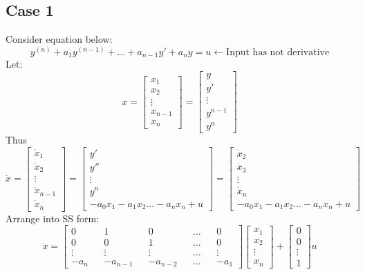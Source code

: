 \subsection{Case 1}
Consider equation below:
\[
y^{(n)} + a_1y^{(n-1)} + ... + a_{n-1}y' + a_n y = u  \leftarrow \text{Input has not derivative}
\]
Let:
\[
x = 
\begin{bmatrix}
	x_1     \\
	x_2     \\
	\vdots  \\
	x_{n-1} \\
	x_n     
\end{bmatrix}
=
\begin{bmatrix}
	y       \\
	y'      \\
	\vdots  \\
	y^{n-1} \\
	y^n     
\end{bmatrix}
\]
Thus
\[
\dot{x} = 
\begin{bmatrix}
	\dot{x}_1     \\
	\dot{x}_2     \\
	\vdots        \\
	\dot{x}_{n-1} \\
	\dot{x}_n     
\end{bmatrix}
=
\begin{bmatrix}
	y'                                \\
	y''                               \\
	\vdots                            \\
	y^n                               \\
	-a_0x_1 - a_1x_2 ... - a_nx_n + u 
\end{bmatrix}
=
\begin{bmatrix}
	\dot{x}_2                         \\
	\dot{x}_3                         \\
	\vdots                            \\
	\dot{x}_n                         \\
	-a_0x_1 - a_1x_2 ... - a_nx_n + u 
\end{bmatrix}
\]
Arrange into SS form:
\[
\dot{x} = 
\begin{bmatrix}
	0      &   & 1        &   & 0        &   & ... &   & 0      \\
	0      &   & 0        &   & 1        &   & ... &   & 0      \\
	\vdots &   & \vdots   &   & \vdots   &   & ... &   & \vdots \\
	-a_n   &   & -a_{n-1} &   & -a_{n-2} &   & ... &   & -a_1   
\end{bmatrix}
\begin{bmatrix}
	x_1    \\
	x_2    \\
	\vdots \\
	x_n    
\end{bmatrix} +
\begin{bmatrix}
	0      \\
	0      \\
	\vdots \\
	1      
\end{bmatrix} u
\]
